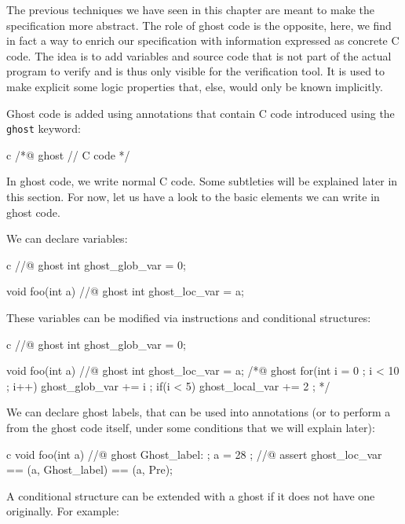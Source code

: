 
The previous techniques we have seen in this chapter are meant to make the
specification more abstract. The role of ghost code is the opposite, here, we
find in fact a way to enrich our specification with information expressed as
concrete C code. The idea is to add variables and source code that is not part
of the actual program to verify and is thus only visible for the verification
tool. It is used to make explicit some logic properties that, else, would only
be known implicitly.




Ghost code is added using annotations that contain C code
introduced using the \texttt{ghost} keyword:


\begin{CodeBlock}{c}
/*@
  ghost
  // C code
*/
\end{CodeBlock}


In ghost code, we write normal C code. Some subtleties will be explained
later in this section. For now, let us have a look to the basic elements
we can write in ghost code.


We can declare variables:


\begin{CodeBlock}{c}
//@ ghost int ghost_glob_var = 0;

void foo(int a){
  //@ ghost int ghost_loc_var = a;
}
\end{CodeBlock}


These variables can be modified via instructions and conditional structures:


\begin{CodeBlock}{c}
//@ ghost int ghost_glob_var = 0;

void foo(int a){
  //@ ghost int ghost_loc_var = a;
  /*@ ghost
    for(int i = 0 ; i < 10 ; i++){
      ghost_glob_var += i ;
      if(i < 5) ghost_local_var += 2 ;
    }
  */
}
\end{CodeBlock}


We can declare ghost labels, that can be used into annotations (or to perform
a  from the ghost code itself, under some conditions that
we will explain later):


\begin{CodeBlock}{c}
void foo(int a){
  //@ ghost Ghost_label: ;
  a = 28 ;
  //@ assert ghost_loc_var == \at(a, Ghost_label) == \at(a, Pre);
}
\end{CodeBlock}


A conditional structure  can be extended with a ghost
 if it does not have one originally. For example:


